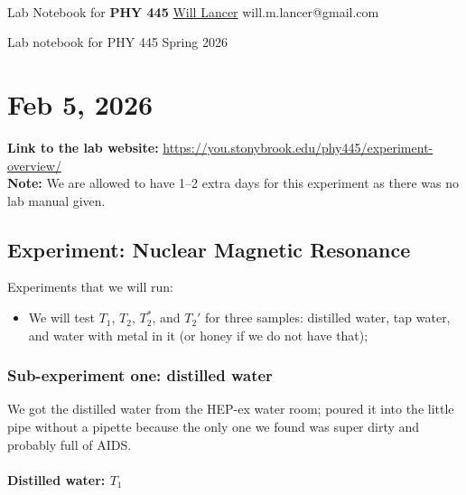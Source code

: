 \documentclass[11pt]{article}
\begin{document}
\thispagestyle{empty}
\bigskip \
\vspace{0.1cm}

\begin{center}
{\fontsize{22}{22} \selectfont Lab Notebook for}
\vskip 16pt
{\fontsize{36}{36} \selectfont \bf \sffamily PHY 445}
\vskip 24pt
	{\fontsize{18}{18} \selectfont \rmfamily \href{https://will-lancer.github.io}{Will Lancer}} 
\vskip 6pt
{\fontsize{14}{14} \selectfont \ttfamily will.m.lancer@gmail.com} 
\vskip 24pt
\end{center}

{\parindent0pt \baselineskip=15.5pt}
\noin
Lab notebook for PHY 445 Spring 2026

\newpage
\microtoc
\newpage

\section{Feb 5, 2026}

\textbf{Link to the lab website:} \url{https://you.stonybrook.edu/phy445/experiment-overview/}\\

\noin
\textbf{Note:} We are allowed to have 1--2 extra days for this experiment as there was no lab manual given.

\subsection{Experiment: Nuclear Magnetic Resonance}

Experiments that we will run:

\begin{itemize}
    \item We will test $T_1$, $T_2$, $T_2^*$, and $T_2'$ for three samples: distilled water, 
    tap water, and water with metal in it (or honey if we do not have that);
\end{itemize}

\subsubsection{Sub-experiment one: distilled water}

We got the distilled water from the HEP-ex water room; poured it into the little pipe 
without a pipette because the only one we found was super dirty and probably full of
AIDS.


\paragraph{Distilled water: $T_1$}
\end{document}
